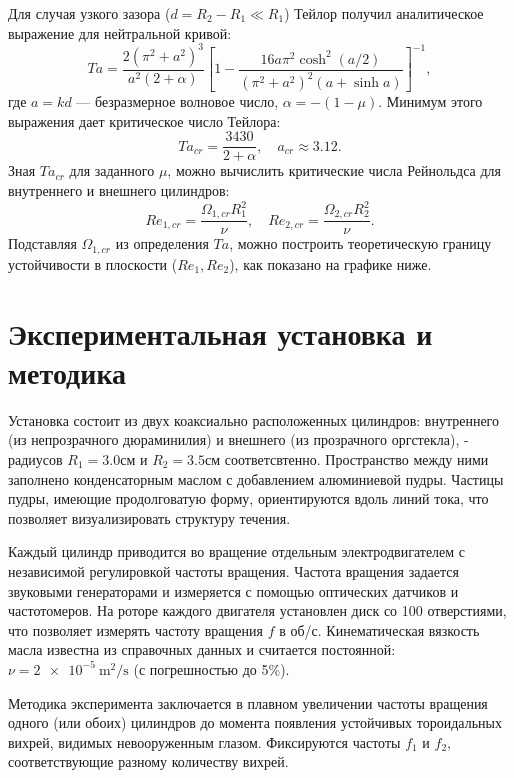 \documentclass[a4paper,12pt]{article}
\begin{document}
Для случая узкого зазора (\(d = R_2-R_1 \ll R_1\)) Тейлор получил аналитическое выражение для нейтральной кривой:
\begin{equation}
Ta = \frac{2(\pi^2 + a^2)^3}{a^2(2 + \alpha)} \left[ 1 - \frac{16a\pi^2 \cosh^2(a/2)}{(\pi^2 + a^2)^2(a + \sinh a)} \right]^{-1},
\label{eq:taylor_narrow}
\end{equation}
где \(a = kd\) — безразмерное волновое число, \(\alpha = -(1-\mu)\). Минимум этого выражения дает критическое число Тейлора:
\begin{equation}
Ta_{cr} = \frac{3430}{2 + \alpha}, \quad a_{cr} \approx 3.12.
\label{eq:taylor_crit}
\end{equation}
Зная \(Ta_{cr}\) для заданного \(\mu\), можно вычислить критические числа Рейнольдса для внутреннего и внешнего цилиндров:
\begin{equation}
Re_{1,cr} = \frac{\Omega_{1,cr} R_1^2}{\nu}, \quad Re_{2,cr} = \frac{\Omega_{2,cr} R_2^2}{\nu}.
\label{eq:Re_crit}
\end{equation}
Подставляя \(\Omega_{1,cr}\) из определения \(Ta\), можно построить теоретическую границу устойчивости в плоскости (\(Re_1, Re_2\)), как показано на графике ниже.

\newpage
\section{Экспериментальная установка и методика}
Установка состоит из двух коаксиально расположенных цилиндров: внутреннего (из непрозрачного дюраминилия) и внешнего (из прозрачного оргстекла), - радиусов  \(R_1 = 3.0 \text{см}\) и \(R_2 = 3.5 \text{см}\) соответсвтенно. Пространство между ними заполнено конденсаторным маслом с добавлением алюминиевой пудры. Частицы пудры, имеющие продолговатую форму, ориентируются вдоль линий тока, что позволяет визуализировать структуру течения.

Каждый цилиндр приводится во вращение отдельным электродвигателем с независимой регулировкой частоты вращения. Частота вращения задается звуковыми генераторами и измеряется с помощью оптических датчиков и частотомеров. На роторе каждого двигателя установлен диск со 100 отверстиями, что позволяет измерять частоту вращения \(f\) в об/с. Кинематическая вязкость масла известна из справочных данных и считается постоянной: \(\nu = \SI{2e-5}{\square\meter\per\second}\) (с погрешностью до 5\%).

Методика эксперимента заключается в плавном увеличении частоты вращения одного (или обоих) цилиндров до момента появления устойчивых тороидальных вихрей, видимых невооруженным глазом. Фиксируются частоты \(f_1\) и \(f_2\), соответствующие разному количеству вихрей.
\end{document}
